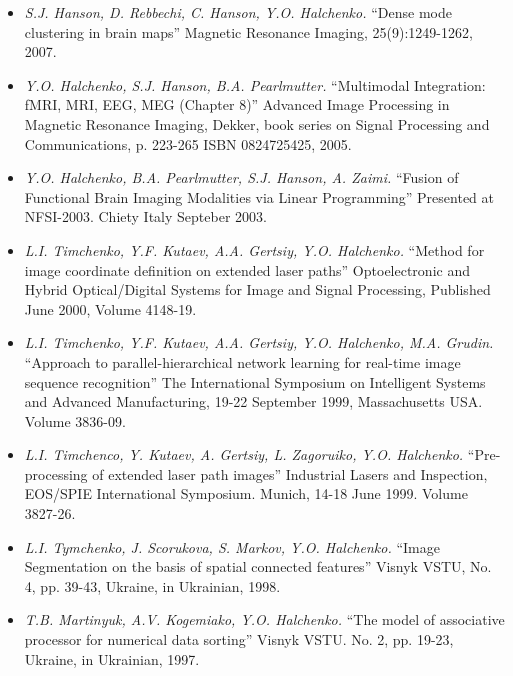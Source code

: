 \documentclass[10pt,overlapped,line]{res}
\newcommand{\mtitle}[1]{``#1''}
\newcommand{\mauthors}[1]{ \textit{#1.}}
\newcommand{\mwhere}[1]{#1.}
\begin{document}
\begin{resume}
\begin{itemize}
  \item
    \mauthors{S.J. Hanson, D. Rebbechi, C. Hanson, Y.O. Halchenko}
    \mtitle{Dense mode clustering in brain maps}
    \mwhere{Magnetic Resonance Imaging, 25(9):1249-1262, 2007}

  \item
    \mauthors{Y.O. Halchenko, S.J. Hanson, B.A. Pearlmutter}
    \mtitle{Multimodal Integration: fMRI, MRI, EEG, MEG (Chapter 8)}
    \mwhere{Advanced Image Processing in Magnetic Resonance Imaging,
      Dekker, book series on Signal Processing and Communications, p. 223-265
      ISBN 0824725425, 2005}

  \item
     \mauthors{Y.O. Halchenko, B.A. Pearlmutter, S.J. Hanson, A. Zaimi}
     \mtitle{Fusion of Functional Brain Imaging Modalities via Linear Programming}
     \mwhere{Presented at NFSI-2003. Chiety Italy Septeber 2003}

  \item
     \mauthors{L.I. Timchenko, Y.F. Kutaev, A.A. Gertsiy, Y.O. Halchenko}
     \mtitle{Method for image coordinate definition on extended laser paths}
     \mwhere{Optoelectronic and Hybrid Optical/Digital Systems for Image and Signal Processing, Published June 2000,  Volume 4148-19}

  \item
     \mauthors{L.I. Timchenko, Y.F. Kutaev, A.A. Gertsiy, Y.O. Halchenko,
     M.A. Grudin}
     \mtitle{Approach to parallel-hierarchical network learning for real-time image sequence recognition}
     \mwhere{The International Symposium on Intelligent Systems and Advanced Manufacturing, 19-22 September 1999, Massachusetts USA. Volume 3836-09}

   \item
     \mauthors{L.I. Timchenco, Y. Kutaev, A. Gertsiy, L. Zagoruiko, Y.O. Halchenko}
     \mtitle{Pre-processing of extended laser path images}
     \mwhere{Industrial Lasers and Inspection, EOS/SPIE International Symposium. Munich, 14-18 June 1999. Volume 3827-26}

   \item
     \mauthors{L.I. Tymchenko, J. Scorukova, S. Markov, Y.O. Halchenko}
     \mtitle{Image Segmentation on the basis of spatial connected features}
     \mwhere{Visnyk VSTU, No. 4, pp. 39-43, Ukraine, in Ukrainian, 1998}

   \item
     \mauthors{T.B. Martinyuk, A.V. Kogemiako, Y.O. Halchenko}
     \mtitle{The model of associative processor for numerical data sorting}
     \mwhere{ Visnyk VSTU. No. 2, pp. 19-23, Ukraine, in Ukrainian, 1997}


\end{itemize}
\end{resume}
\end{document}
